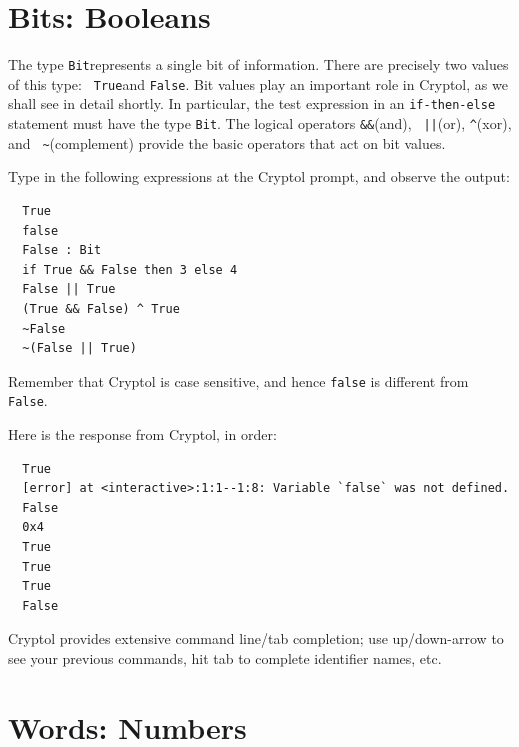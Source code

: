 \section{Bits: Booleans}
\label{sec:bits}

The type {\tt Bit}\indTheBitType represents a single bit of
information. There are precisely two values of this type: {\tt
  True}\indTrue and {\tt False}\indFalse. Bit values play an important
role in Cryptol, as we shall see in detail shortly. In particular, the
test expression in an {\tt if-then-else} statement must have the type
{\tt Bit}.  The logical operators {\tt \&\&}\indAnd (and), {\tt
  ||}\indOr (or), {\tt \Verb|^|}\indXOr (xor), and {\tt
  \Verb|~|}\indComplement (complement) provide the basic operators
that act on bit values.

\begin{Exercise}\label{ex:dataBit}
  Type in the following expressions at the Cryptol prompt, and observe
  the output:
\begin{Verbatim}
  True
  false
  False : Bit
  if True && False then 3 else 4
  False || True
  (True && False) ^ True
  ~False
  ~(False || True)
\end{Verbatim}
Remember that Cryptol is case sensitive, and hence {\tt false} is
different from {\tt False}.\indCaseSensitive
\end{Exercise}
\begin{Answer}
Here is the response from Cryptol, in order:
\begin{small}
\begin{Verbatim}
  True
  [error] at <interactive>:1:1--1:8: Variable `false` was not defined.
  False
  0x4
  True
  True
  True
  False
\end{Verbatim}
\end{small}
\end{Answer}

\begin{tip}
  Cryptol provides extensive command line/tab completion; use
  up/down-arrow to see your previous commands, hit tab to complete
  identifier names, etc.
\end{tip}

\section{Words: Numbers}
\label{sec:words}

